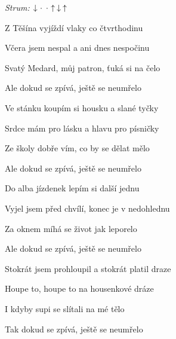 \begin{song}


\begin{headerbox}
 \quad
\textit{Strum:} $\Down\Miss\Miss\Up\Down\Up$
\end{headerbox}

\begin{hchordbox}
\end{hchordbox}

\bigskip

Z Těšína vyjíždí vlaky co čtvrthodinu    \par
{}Včera jsem nespal a ani dnes nespočinu   \par
{}Svatý Medard, můj patron, ťuká si na čelo \par
Ale dokud se zpívá, ještě se neumřelo    \par

\bigskip

Ve stánku koupím si housku a slané tyčky    \par
{}Srdce mám pro lásku a hlavu pro písničky    \par
{}Ze školy dobře vím, co by se dělat mělo \par
Ale dokud se zpívá, ještě se neumřelo    \par

\bigskip

Do alba jízdenek lepím si další jednu    \par
{}Vyjel jsem před chvílí, konec je v nedohlednu    \par
{}Za oknem míhá se život jak leporelo \par
Ale dokud se zpívá, ještě se neumřelo    \par

\bigskip

Stokrát jsem prohloupil a stokrát platil draze    \par
{}Houpe to, houpe to na housenkové dráze    \par
{}I kdyby supi se slítali na mé tělo \par
Tak dokud se zpívá, ještě se neumřelo    \par


\end{song}
